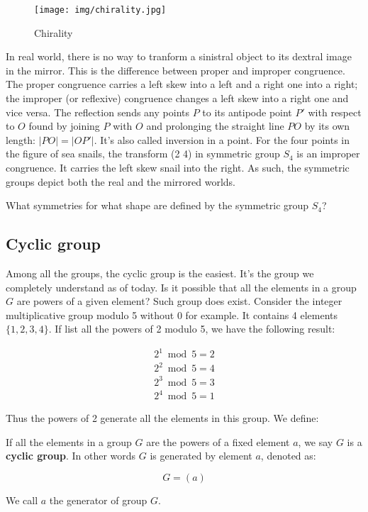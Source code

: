 \documentclass[b5paper]{article}
\begin{document}
\begin{figure}[htbp]
 \centering
 \texttt{[image: img/chirality.jpg]}
 \caption{Chirality}
 \label{fig:chirality}
\end{figure}

In real world, there is no way to tranform a sinistral object to its dextral image in the mirror. This is the difference between proper and improper congruence. The proper congruence carries a left skew into a left and a right one into a right; the improper (or reflexive) congruence changes a left skew into a right one and vice versa\cite{Weyl1952}. The reflection sends any points $P$ to its antipode point $P'$ with respect to $O$ found by joining $P$ with $O$ and prolonging the straight line $PO$ by its own length: $|PO| = |OP'|$. It's also called inversion in a point. For the four points in the figure of sea snails, the transform (2 4) in symmetric group $S_4$ is an improper congruence. It carries the left skew snail into the right. As such, the symmetric groups depict both the real and the mirrored worlds.

\begin{Exercise}
What symmetries for what shape are defined by the symmetric group $S_4$?
\end{Exercise}

\subsection{Cyclic group}

Among all the groups, the cyclic group is the easiest. It's the group we completely understand as of today. Is it possible that all the elements in a group $G$ are powers of a given element? Such group does exist. Consider the integer multiplicative group modulo 5 without 0 for example. It contains 4 elements $\{1, 2, 3, 4\}$. If list all the powers of 2 modulo 5, we have the following result:

\[
\begin{array}{l}
2^1 \bmod 5 = 2 \\
2^2 \bmod 5 = 4 \\
2^3 \bmod 5 = 3 \\
2^4 \bmod 5 = 1
\end{array}
\]

Thus the powers of 2 generate all the elements in this group. We define:

\begin{definition}
If all the elements in a group $G$ are the powers of a fixed element $a$, we say $G$ is a \textbf{cyclic group}. In other words $G$ is generated by element $a$, denoted as:

\[
G = (a)
\]

We call $a$ the generator of group $G$.
\end{definition}
\end{document}
